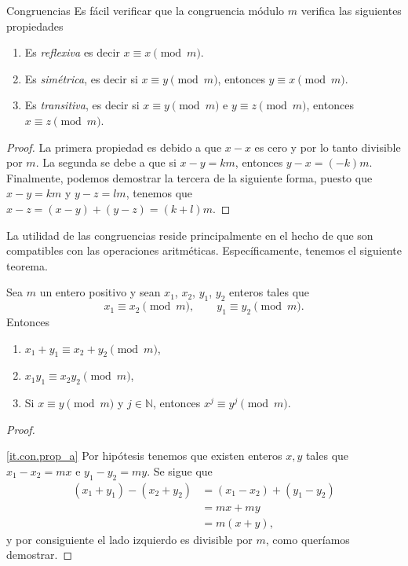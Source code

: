 \begin{section}{Congruencias}
Es fácil verificar que la {congruencia módulo} $m$ verifica las siguientes propiedades
\begin{enumerate}[label=\textit{\alph*)}]
\item
Es \textit{{reflexiva}} es decir $x\equiv x\pmod{m}$.
\item
Es \textit{{simétrica}}, es decir si $x \equiv y \pmod{m}$, entonces
$y \equiv x \pmod{m}$.
\item
Es \textit{{ transitiva}}, es decir si $x\equiv y \pmod{m}$ e
$y\equiv z \pmod{m}$, entonces $x\equiv z \pmod{m}$.
\end{enumerate}
\begin{proof}
La primera propiedad es debido a que $x-x$ es cero y por lo tanto divisible por $m$. La segunda se debe a que si $x-y=km$, entonces $y-x=(-k)m$. Finalmente, podemos demostrar la tercera de la siguiente forma,  puesto que $x-y=km$ y $y-z=lm$, tenemos que $x-z=(x-y)+(y-z)=(k+l)m$.
\end{proof}


La utilidad de las congruencias reside principalmente en el hecho de que son compatibles con las operaciones aritméticas. Específicamente, tenemos el siguiente teorema.

\begin{teorema}\label{t4.1} Sea $m$ un entero positivo y sean $x_1$, $x_2$,
$y_1$, $y_2$ enteros tales que
$$
x_1 \equiv x_2 \pmod{m}, \qquad y_1 \equiv y_2 \pmod{m}.
$$
Entonces
\begin{enumerate}[label=\textit{\alph*)}]
\item\label{it.con.prop_a} $ x_1+ y_1 \equiv x_2+ y_2 \pmod{m}$,
\item\label{it.con.prop_b}  $x_1 y_1 \equiv x_2 y_2 \pmod{m}$,
\item\label{it.con.prop_c}  Si $x \equiv y \pmod{m}$  y $j \in  \mathbb N$, entonces $x^j \equiv y^j \pmod{m}$.
\end{enumerate}
\end{teorema}
\begin{proof}
\

\ref{it.con.prop_a} Por hipótesis tenemos que existen enteros
$x,y$ tales que $x_1-x_2=mx$ e $y_1-y_2=my$. Se sigue que
$$
\begin{aligned}
(x_1+y_1)-(x_2+y_2) &= (x_1-x_2)+ (y_1 -y_2) \\
&= mx +my \\
&= m(x+y),
\end{aligned}
$$
y por consiguiente el lado izquierdo es divisible por $m$, como
queríamos demostrar.


\end{proof}
\end{section}
